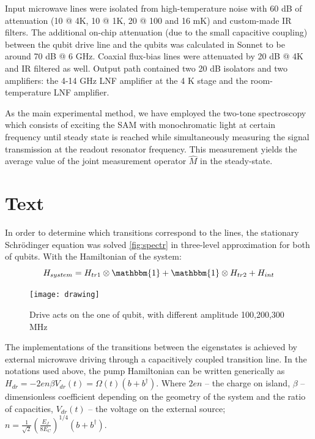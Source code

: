 \documentclass[%
 aip,
 amsmath,amssymb,
 reprint,%
]{revtex4-1}
\begin{document}
Input microwave lines were isolated from high-temperature noise with 60 dB of attenuation (10 @ 4K, 10 @ 1K, 20 @ 100 and 16 mK) and custom-made IR filters. The additional on-chip attenuation (due to the small capacitive coupling) between the qubit drive line and the qubits was calculated in Sonnet to be around 70 dB @ 6 GHz. Coaxial flux-bias lines were attenuated by 20 dB @ 4K and IR filtered as well. Output path contained two 20 dB isolators and two amplifiers: the 4-14 GHz LNF amplifier at the 4 K stage and the room-temperature LNF amplifier.

As the main experimental method, we have employed the two-tone spectroscopy which consists of exciting the SAM with monochromatic light at certain frequency until steady state is reached while simultaneously measuring the signal transmission at the readout resonator frequency. This measurement yields the average value of the joint measurement operator $\hat M$ in the steady-state.

\section{Text}

In order to determine which transitions correspond to the lines, the stationary Schrödinger equation was solved \autoref{fig:spectr} in three-level approximation for both of qubits. With the Hamiltonian of the system:
\begin{equation}
	H_{system} = H_{tr1}\otimes \mathbbm{1}+\mathbbm{1}\otimes H_{tr2}+H_{int}
\end{equation}


\begin{figure}
	\centering
	\texttt{[image: drawing]}
	\caption{Drive acts on the one of qubit, with different amplitude 100,200,300 MHz}
	\label{fig:difdrive}
\end{figure}



 The implementations of the transitions between the eigenstates is achieved by external microwave driving through a capacitively coupled transition line. In the notations used above, the pump Hamiltonian can be written generically as $ 	H_{dr} = -2e n\beta V_{dr}(t)=\Omega(t)(b+b^{\dagger})$.
 Where $2en$ -- the charge on island, $\beta$ -- dimensionless coefficient depending on the geometry of the system and the ratio of capacities, $V_{dr}(t)$ -- the voltage on the external source; $n =\frac{1}{\sqrt{2}} (\frac{E_J}{8E_C})^{1/4}(b+b^{\dagger})$.
 


\end{document}
